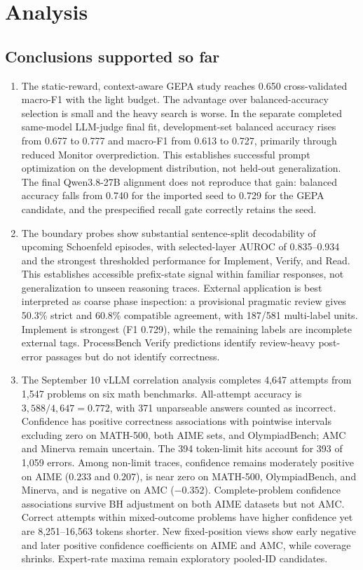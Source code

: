 \section{Analysis}

\subsection{Conclusions supported so far}

\begin{enumerate}
\item The static-reward, context-aware GEPA study reaches 0.650 cross-validated
macro-F1 with the light budget.  The advantage over balanced-accuracy
selection is small and the heavy search is worse.  In the separate completed
same-model LLM-judge final fit, development-set balanced accuracy rises from
0.677 to 0.777 and macro-F1 from 0.613 to 0.727, primarily through reduced
Monitor overprediction.  This establishes successful prompt optimization on
the development distribution, not held-out generalization.  The final
Qwen3.8-27B alignment does not reproduce that gain: balanced accuracy falls
from 0.740 for the imported seed to 0.729 for the GEPA candidate, and the
prespecified recall gate correctly retains the seed.
\item The boundary probes show substantial sentence-split decodability of
upcoming Schoenfeld episodes, with selected-layer AUROC of 0.835--0.934 and
the strongest thresholded performance for Implement, Verify, and Read.  This
establishes accessible prefix-state signal within familiar responses, not
generalization to unseen reasoning traces.  External application is best
interpreted as coarse phase inspection: a provisional pragmatic review gives
50.3\% strict and 60.8\% compatible agreement, with 187/581 multi-label units.
Implement is strongest (F1 0.729), while the remaining labels are incomplete
external tags.  ProcessBench Verify predictions identify review-heavy
post-error passages but do not identify correctness.
\item The September 10 vLLM correlation analysis completes 4,647 attempts
from 1,547 problems on six math benchmarks. All-attempt accuracy is
$3,588/4,647=0.772$, with 371 unparseable answers counted as incorrect.
Confidence has positive correctness associations with pointwise intervals
excluding zero on MATH-500, both AIME sets, and OlympiadBench; AMC and
Minerva remain uncertain. The 394 token-limit hits account for 393 of 1,059
errors. Among non-limit traces, confidence remains moderately positive on
AIME ($0.233$ and $0.207$), is near zero on MATH-500, OlympiadBench, and
Minerva, and is negative on AMC ($-0.352$). Complete-problem confidence
associations survive BH adjustment on both AIME datasets but not AMC.
Correct attempts within mixed-outcome problems have higher confidence yet
are 8,251--16,563 tokens shorter. New fixed-position views show early negative
and later positive confidence coefficients on AIME and AMC, while coverage
shrinks. Expert-rate maxima remain exploratory pooled-ID candidates.
\end{enumerate}

